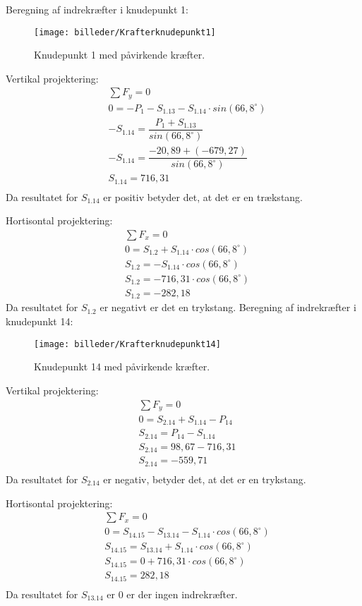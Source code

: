 Beregning af indrekræfter i knudepunkt 1: 
\begin{figure}[H] \centering
\texttt{[image: billeder/Krafterknudepunkt1]}
\caption{Knudepunkt 1 med påvirkende kræfter.}
\end{figure}
Vertikal projektering:
\begin{align*}
& \sum F_{y} = 0 \\
& 0 = - P_{1} - S_{1.13} - S_{1.14} \cdot sin(66,8^ {\circ}) \\
& - S_{1.14} = \dfrac{P_{1}  + S_{1.13}}{sin(66,8^ {\circ}) } \\
& - S_{1.14} = \dfrac{-20,89 + (-679,27)}{sin(66,8^ {\circ}) } \\
& S_{1.14} = 716,31 \\
\end{align*}
Da resultatet for $S_{1.14}$ er positiv betyder det, at det er en trækstang.

Hortisontal projektering:
\begin{align*}
& \sum F_{x} = 0 \\
& 0 = S_{1.2} +  S_{1.14} \cdot cos(66,8^ {\circ}) \\
& S_{1.2} = - S_{1.14} \cdot cos(66,8^ {\circ}) \\
& S_{1.2} = - 716,31 \cdot cos(66,8^ {\circ}) \\
& S_{1.2} = -282,18
\end{align*}
Da resultatet for $S_{1.2}$  er negativt er det en trykstang.
\newpage
Beregning af indrekræfter i knudepunkt 14:
\begin{figure}[H] \centering
\texttt{[image: billeder/Krafterknudepunkt14]} \caption{Knudepunkt 14 med påvirkende kræfter.}
\end{figure}

Vertikal projektering:
\begin{align*}
& \sum F_{y} = 0 \\
& 0 = S_{2.14} + S_{1.14} - P_{14} \\
& S_{2.14} = P_{14} - S_{1.14}\\
& S_{2.14} = 98,67 - 716,31\\
& S_{2.14} =  -559,71 \\
\end{align*}
Da resultatet for $S_{2.14}$ er negativ, betyder det, at det er en trykstang.

Hortisontal projektering:
\begin{align*}
& \sum F_{x} = 0 \\
& 0 = S_{14.15} - S_{13.14} - S_{1.14} \cdot cos(66,8^ {\circ})  \\
& S_{14.15} = S_{13.14} + S_{1.14} \cdot cos(66,8^ {\circ})  \\
& S_{14.15} = 0 + 716,31 \cdot cos(66,8^ {\circ})  \\
& S_{14.15} = 282,18 \\
\end{align*}
Da resultatet for $S_{13.14}$ er 0 er der ingen indrekræfter.

